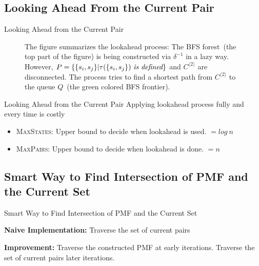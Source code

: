\documentclass{beamer}
\begin{document}
\subsection{Looking Ahead From the Current Pair}
\begin{frame}{Looking Ahead from the Current Pair}
\begin{figure}[ht]
	\centering
	\caption{The figure summarizes the lookahead process: The BFS forest~(the top part of the figure) is being constructed via $\delta^{-1}$ in a lazy way. However, $P = \{ \{s_i, s_j \} | \tau(\{s_i, s_j \})~ \mbox{\em is defined} \}$ and $C^{\langle 2 \rangle}$ are disconnected. The process tries to find a shortest path from $C^{\langle 2 \rangle}$ to the queue $Q$~(the green colored BFS frontier).}
	\label{fig:lookahead}
\end{figure}
\end{frame}


\begin{frame}{Looking Ahead from the Current Pair}
Applying lookahead process fully and every time is costly
\begin{itemize}
	\item \textsc{MaxStates}: Upper bound to decide when lookahead is used. $=log\ n$
	\item \textsc{MaxPairs}: Upper bound to decide when lookahead is done. $=n$
\end{itemize} 
\end{frame}


\subsection{Smart Way to Find Intersection of PMF and the Current Set}
\begin{frame}{Smart Way to Find Intersection of PMF and the Current Set}

\textbf{Naive Implementation:} Traverse the set of current pairs

\medskip

\textbf{Improvement:} Traverse the constructed PMF at early iterations. Traverse the set of current pairs later iterations.
\end{frame}
\end{document}
